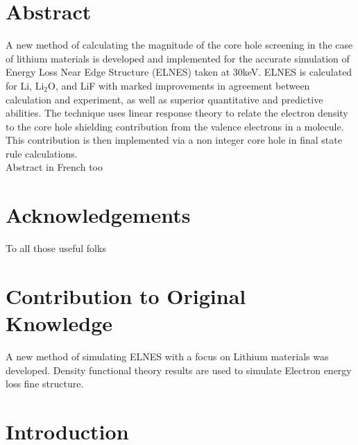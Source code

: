 \documentclass[12pt]{report}
\begin{document}









\chapter*{Abstract}
\renewcommand{\thepage}{\roman{page}}%


A new method of calculating the magnitude of the core hole screening in the case of lithium materials is developed and implemented for the accurate simulation of Energy Loss Near Edge Structure (ELNES) taken at 30keV.  ELNES is calculated for Li, $\mathrm{Li_2O}$, and LiF with marked improvements in agreement between calculation and experiment, as well as superior quantitative and predictive abilities.   The technique uses linear response theory to relate the electron density to the core hole shielding contribution from the valence electrons in a molecule.  This contribution is then implemented via a non integer core hole in final state rule calculations.
\\
Abstract in French too

\chapter*{Acknowledgements}
To all those useful folks


\chapter*{Contribution to Original Knowledge}
A new method of simulating ELNES with a focus on Lithium materials was developed.  Density functional theory results are used to simulate Electron energy loss fine structure.  



\tableofcontents

\chapter{Introduction}
\renewcommand{\thepage}{\arabic{page}}%
\setcounter{page}{1}%


\end{document}
